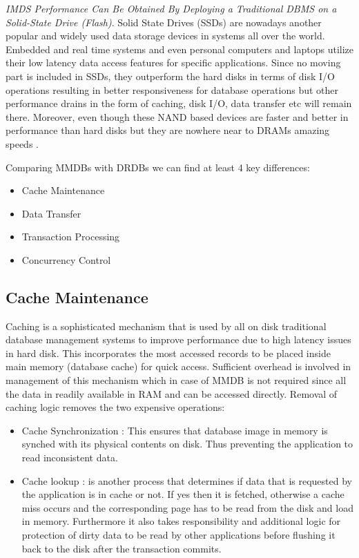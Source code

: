 \documentclass[12pt]{article} %
\begin{document}
\emph{ IMDS Performance Can Be Obtained By Deploying a Traditional DBMS on a Solid-State Drive (Flash)}. Solid State Drives (SSDs) are nowadays another popular and widely used data storage devices in systems all over the world. Embedded and real time systems and even personal computers and laptops utilize their low latency data access features for specific applications. Since no moving part is included in SSDs, they outperform the hard disks in terms of disk I/O operations resulting in better responsiveness for database operations \cite{Mcobject-Myths} but other performance drains in the form of caching, disk I/O, data transfer etc will remain there. Moreover, even though these NAND based devices are faster and better in performance than hard disks but they are nowhere near to DRAMs amazing speeds \cite{ssds}. 

Comparing MMDBs with DRDBs we can find at least 4 key differences:

\begin{itemize}
\item Cache Maintenance
\item Data Transfer
\item Transaction Processing
\item Concurrency Control 
\end{itemize}

\subsection{Cache Maintenance}
Caching is a sophisticated mechanism that is used by all on disk traditional database management systems to improve performance due to high latency issues in hard disk. This incorporates the most accessed records to be placed inside main memory (database cache) for quick access. Sufficient overhead is involved in management of this mechanism which in case of MMDB is not required since all the data in readily available in RAM and can be accessed directly. Removal of caching logic removes the two expensive operations:

\begin{itemize}
\item Cache Synchronization : This ensures that database image in memory is synched with its physical contents on disk. Thus preventing the application to read inconsistent data. 

\item Cache lookup : is another process that determines if data that is requested by the application is in cache or not. If yes then it is fetched, otherwise a cache miss occurs and the corresponding page has to be read from the disk and load in memory. Furthermore it also takes responsibility and additional logic for protection of dirty data to be read by other applications before flushing it back to the disk after the transaction commits.
\end{itemize}
\end{document}
